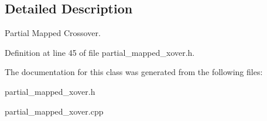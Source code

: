 \subsection{Detailed Description}
Partial Mapped Crossover. 



Definition at line 45 of file partial\_\-mapped\_\-xover.h.

The documentation for this class was generated from the following files:\begin{CompactItemize}
\item 
partial\_\-mapped\_\-xover.h\item 
partial\_\-mapped\_\-xover.cpp\end{CompactItemize}
